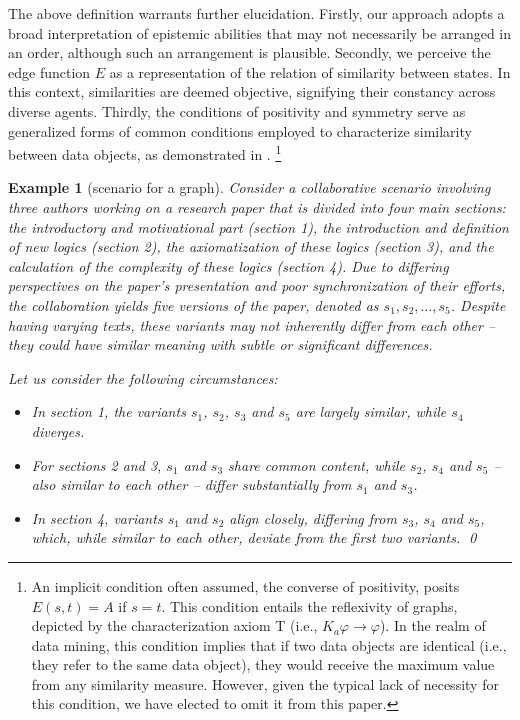 \documentclass{article}
\newtheorem{example}[theorem]{Example}%
\renewcommand{\phi}{\varphi}
\newcommand{\ra}{\rightarrow}
\begin{document}
The above definition warrants further elucidation. Firstly, our approach adopts a broad interpretation of epistemic abilities that may not necessarily be arranged in an order, although such an arrangement is plausible. Secondly, we perceive the edge function $E$ as a representation of the relation of similarity between states. In this context, similarities are deemed objective, signifying their constancy across diverse agents. Thirdly, the conditions of positivity and symmetry serve as generalized forms of common conditions employed to characterize similarity between data objects, as demonstrated in \cite{TSK2005}.%
\footnote{An implicit condition often assumed, the converse of positivity, posits $E(s,t)=A$ if $s=t$. This condition entails the reflexivity of graphs, depicted by the characterization axiom T (i.e., $K_a\phi \ra \phi$). In the realm of data mining, this condition implies that if two data objects are identical (i.e., they refer to the same data object), they would receive the maximum value from any similarity measure. However, given the typical lack of necessity for this condition, we have elected to omit it from this paper.}

\begin{example}[scenario for a graph]\label{ex1}
Consider a collaborative scenario involving three authors working on a research paper that is divided into four main sections: the introductory and motivational part (section 1), the introduction and definition of new logics (section 2), the axiomatization of these logics (section 3), and the calculation of the complexity of these logics (section 4). Due to differing perspectives on the paper's presentation and poor synchronization of their efforts, the collaboration yields five versions of the paper, denoted as $s_1, s_2, \dots, s_5$. Despite having varying texts, these variants may not inherently differ from each other -- they could have similar meaning with subtle or significant differences.

Let us consider the following circumstances:
\begin{itemize}
\item In section 1, the variants $s_1$, $s_2$, $s_3$ and $s_5$ are largely similar, while $s_4$ diverges.
\item For sections 2 and 3, $s_1$ and $s_3$ share common content, while $s_2$, $s_4$ and $s_5$ -- also similar to each other -- differ substantially from $s_1$ and $s_3$.
\item In section 4, variants $s_1$ and $s_2$ align closely, differing from $s_3$, $s_4$ and $s_5$, which, while similar to each other, deviate from the first two variants.
\qed
\end{itemize}
\end{example}
\end{document}
